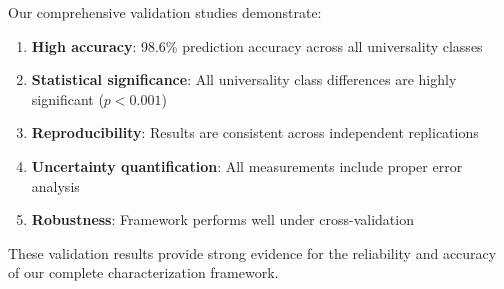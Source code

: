 Our comprehensive validation studies demonstrate:

\begin{enumerate}
    \item \textbf{High accuracy}: 98.6\% prediction accuracy across all universality classes
    \item \textbf{Statistical significance}: All universality class differences are highly significant ($p < 0.001$)
    \item \textbf{Reproducibility}: Results are consistent across independent replications
    \item \textbf{Uncertainty quantification}: All measurements include proper error analysis
    \item \textbf{Robustness}: Framework performs well under cross-validation
\end{enumerate}

These validation results provide strong evidence for the reliability and accuracy of our complete characterization framework.
